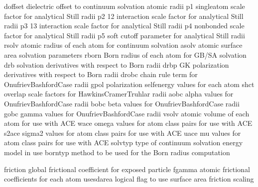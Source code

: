 \documentclass[letterpaper,11pt,english]{sphinxmanual}
\begin{document}

\begin{sphinxVerbatim}[commandchars=\\\{\}]
doffset         dielectric offset to continuum solvation atomic radii
p1              single\PYGZhy{}atom scale factor for analytical Still radii
p2              1\PYGZhy{}2 interaction scale factor for analytical Still radii
p3              1\PYGZhy{}3 interaction scale factor for analytical Still radii
p4              nonbonded scale factor for analytical Still radii
p5              soft cutoff parameter for analytical Still radii
rsolv           atomic radius of each atom for continuum solvation
asolv           atomic surface area solvation parameters
rborn           Born radius of each atom for GB/SA solvation
drb             solvation derivatives with respect to Born radii
drbp            GK polarization derivatives with respect to Born radii
drobc           chain rule term for Onufriev\PYGZhy{}Bashford\PYGZhy{}Case radii
gpol            polarization self\PYGZhy{}energy values for each atom
shct            overlap scale factors for Hawkins\PYGZhy{}Cramer\PYGZhy{}Truhlar radii
aobc            alpha values for Onufriev\PYGZhy{}Bashford\PYGZhy{}Case radii
bobc            beta values for Onufriev\PYGZhy{}Bashford\PYGZhy{}Case radii
gobc            gamma values for Onufriev\PYGZhy{}Bashford\PYGZhy{}Case radii
vsolv           atomic volume of each atom for use with ACE
wace            \PYGZdq{}omega\PYGZdq{} values for atom class pairs for use with ACE
s2ace           \PYGZdq{}sigma\PYGZca{}2\PYGZdq{} values for atom class pairs for use with ACE
uace            \PYGZdq{}mu\PYGZdq{} values for atom class pairs for use with ACE
solvtyp         type of continuum solvation energy model in use
borntyp         method to be used for the Born radius computation
\end{sphinxVerbatim}


\begin{sphinxVerbatim}[commandchars=\\\{\}]
friction        global frictional coefficient for exposed particle
fgamma          atomic frictional coefficients for each atom
use\PYGZus{}sdarea      logical flag to use surface area friction scaling
\end{sphinxVerbatim}

\end{document}
